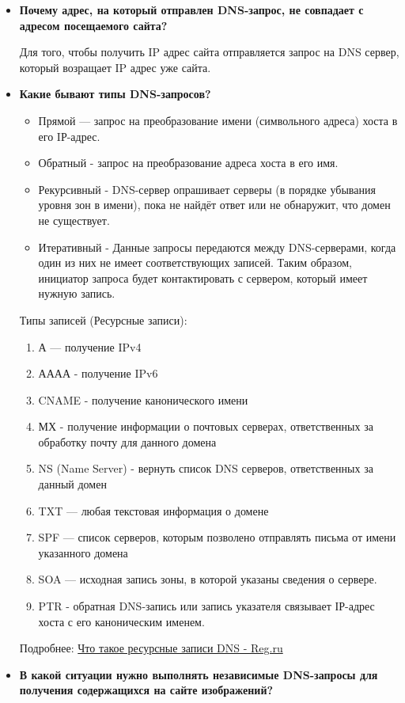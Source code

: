 \documentclass[12pt,onecolumn]{article}
\begin{document}
\begin{itemize}
    \item {
        \textbf{Почему адрес, на который отправлен DNS-запрос, не совпадает с адресом посещаемого сайта?}

        Для того, чтобы получить IP адрес сайта отправляется запрос на DNS сервер,
который возращает IP адрес уже сайта. 
    }
    \item{
        \textbf{Какие бывают типы DNS-запросов?}

        \begin{itemize}
            \item Прямой — запрос на преобразование имени (символьного адреса) хоста в
            его IР-адрес.
            \item Обратный - запрос на преобразование адреса хоста в его имя.
            \item Рекурсивный - DNS-сервер опрашивает серверы (в порядке убывания
            уровня зон в имени), пока не найдёт ответ или не обнаружит, что домен не
            существует.
            \item Итеративный - Данные запросы передаются между DNS-серверами, когда один из них не имеет соответствующих записей. Таким образом, инициатор запроса будет контактировать с сервером, который имеет нужную запись.
        \end{itemize}

        Типы записей (Ресурсные записи): 
        \begin{enumerate}
            \item А — получение IPv4
            \item АААА - получение IPv6
            \item CNAME - получение канонического имени
            \item МХ - получение информации о почтовых серверах, ответственных за
            обработку почту для данного домена
            \item NS (Name Server) - вернуть список DNS серверов, ответственных за
            данный домен
            \item TXT — любая текстовая информация о домене
            \item SPF — список серверов, которым позволено отправлять письма от имени указанного домена
            \item SOA — исходная запись зоны, в которой указаны сведения о сервере.
            \item PTR - обратная DNS-запись или запись указателя связывает ІР-адрес
            хоста с его каноническим именем.
        \end{enumerate}
        Подробнее: \href{https://help.reg.ru/support/dns-servery-i-nastroyka-zony/nastroyka-resursnykh-zapisey-dns/chto-takoye-resursnyye-zapisi-dns#8}{Что такое ресурсные записи DNS - Reg.ru}
    }
    \item {
        \textbf{В какой ситуации нужно выполнять независимые DNS-запросы для получения содержащихся на сайте изображений?}

}
\end{itemize}
\end{document}
